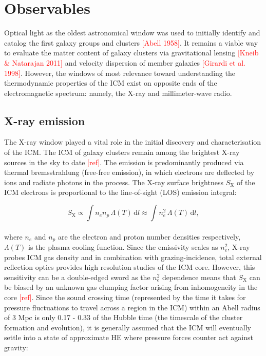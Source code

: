 \newpage
\section{Observables}\label{Chap:scientificLandscapeObservables}

Optical light as the oldest astronomical window was used to initially identify and catalog the first galaxy groups and clusters \textcolor{red}{[Abell 1958]}. It remains a viable way to evaluate the matter content of galaxy clusters via gravitational lensing \textcolor{red}{[Kneib \& Natarajan 2011]} and velocity dispersion of member galaxies  \textcolor{red}{[Girardi et al. 1998]}. However, the windows of most relevance toward understanding the thermodynamic properties of the ICM exist on opposite ends of the electromagnetic spectrum: namely, the X-ray and millimeter-wave radio.

\subsection{X-ray emission}\label{Chap:scientificLandscapeObservablesXray}

The X-ray window played a vital role in the initial discovery and characterisation of the ICM. The ICM of galaxy clusters remain among the brightest X-ray sources in the sky to date \textcolor{red}{[ref]}. The emission is predominantly produced via thermal bremsstrahlung (free-free emission), in which electrons are deflected by ions and radiate photons in the process. The X-ray surface brightness $S_\mathrm{X}$ of the ICM electrons is proportional to the line-of-sight (LOS) emission integral:

\begin{equation}
	S_\mathrm{X} \propto \int n_e n_p \, \Lambda(T) \, \mathrm{d}l 
	\approx \int n_e^2 \, \Lambda(T) \, \mathrm{d}l,
	\label{eq:Sx}
\end{equation}
\\
where $n_e$ and $n_p$ are the electron and proton number densities respectively, $\Lambda(T)$ is the plasma cooling function. Since the emissivity scales as $n_e^2$, X-ray probes ICM gas density and in combination with grazing-incidence, total external reflection optics provides high resolution studies of the ICM core. However, this sensitivity can be a double-edged sword as the $n_e^2$ dependence means that $S_\mathrm{X}$ can be biased by an unknown gas clumping factor arising from inhomogeneity in the core \textcolor{red}{[ref]}.
\pbreak
Since the sound crossing time (represented by the time it takes for pressure fluctuations to travel across a region in the ICM)  within an Abell radius of 3 Mpc is only 0.17 - 0.33 of the Hubble time (the timescale of the cluster formation and evolution), it is generally assumed that the ICM will eventually settle into a state of approximate HE where pressure forces counter act against gravity:

